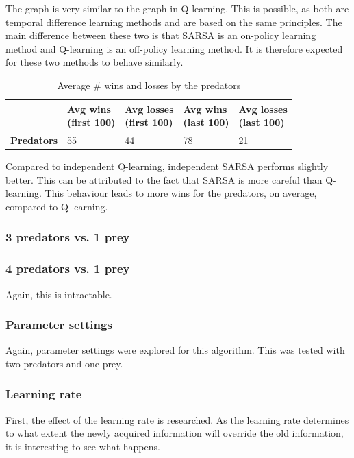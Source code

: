 The graph is very similar to the graph in Q-learning. This is possible, as both are temporal difference learning methods and are based on the same principles. The main difference between these two is that SARSA is an on-policy learning method and Q-learning is an off-policy learning method. It is therefore expected for these two methods to behave similarly.

\begin{table}[H]
\begin{center}
\begin{tabular}{| l | l | l | l | l |}
\hline
 & \parbox{2cm}{\textbf{Avg wins \\ (first 100)}} & \parbox{2cm}{\textbf{Avg losses \\ (first 100)}} & \parbox{2cm}{\textbf{Avg wins \\ (last 100)}} & \parbox{2cm}{\textbf{Avg losses \\ (last 100)}} \\
\hline
\textbf{Predators} & 55 & 44 & 78 & 21 \\
\hline
\end{tabular}
\caption{Average \# wins and losses by the predators}
\end{center}
\end{table}

Compared to independent Q-learning, independent SARSA performs slightly better. This can be attributed to the fact that SARSA is more careful than Q-learning. This behaviour leads to more wins for the predators, on average, compared to Q-learning.

\subsubsection{3 predators vs. 1 prey}

\subsubsection{4 predators vs. 1 prey}
Again, this is intractable. 

\subsubsection{Parameter settings}
Again, parameter settings were explored for this algorithm. This was tested with two predators and one prey.

\subsubsection{Learning rate}
First, the effect of the learning rate is researched. As the learning rate determines to what extent the newly acquired information will override the old information, it is interesting to see what happens. 

